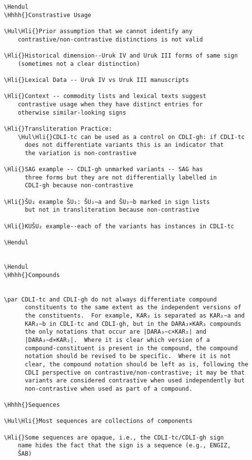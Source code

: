 \begin{verbatim}
\Hendul
\Hhhh{}Constrastive Usage

\Hul\Hli{}Prior assumption that we cannot identify any
	contrastive/non-contrastive distinctions is not valid

\Hli{}Historical dimension--Uruk IV and Uruk III forms of same sign
	(sometimes not a clear distinction)

\Hli{}Lexical Data -- Uruk IV vs Uruk III manuscripts

\Hli{}Context -- commodity lists and lexical texts suggest
  	contrastive usage when they have distinct entries for
  	otherwise similar-looking signs

\Hli{}Transliteration Practice:
	\Hul\Hli{}CDLI-tc can be used as a control on CDLI-gh: if CDLI-tc
  	  does not differentiate variants this is an indicator that
  	  the variation is non-contrastive

\Hli{}SAG example -- CDLI-gh unmarked variants -- SAG has
  	  three forms but they are not differentially labelled in
  	  CDLI-gh because non-contrastive

\Hli{}ŠU₂ example ŠU₂: ŠU₂∼a and ŠU₂∼b marked in sign lists
  	  but not in transliteration because non-contrastive

\Hli{}KUŠU₂ example--each of the variants has instances in CDLI-tc

\Hendul


\Hendul
\Hhhh{}Compounds


\par CDLI-tc and CDLI-gh do not always differentiate compound
      constituents to the same extent as the independent versions of
      the constituents.  For example, KAR₂ is separated as KAR₂∼a and
      KAR₂∼b in CDLI-tc and CDLI-gh, but in the DARA₃×KAR₂ compounds
      the only notations that occur are |DARA₃∼c×KAR₂| and
      |DARA₃∼d×KAR₂|.  Where it is clear which version of a
      compound-constituent is present in the compound, the compound
      notation should be revised to be specific.  Where it is not
      clear, the compound notation should be left as is, following the
      CDLI perspective on contrastive/non-contrastive; it may be that
      variants are considered contrastive when used independently but
      non-contrastive when used as part of a compound.

\Hhhh{}Sequences

\Hul\Hli{}Most sequences are collections of components

\Hli{}Some sequences are opaque, i.e., the CDLI-tc/CDLI-gh sign
	name hides the fact that the sign is a sequence (e.g., ENGIZ,
	ŠAB)


\end{verbatim}
